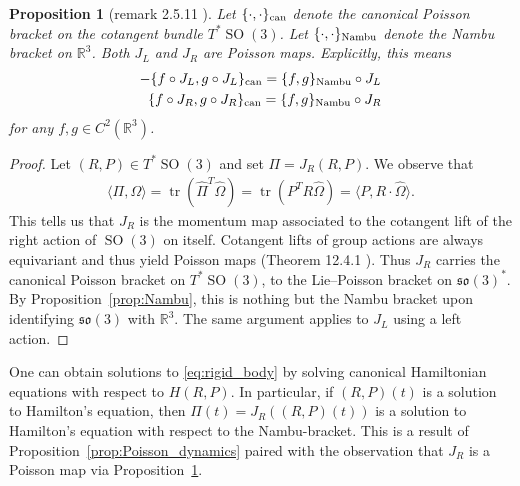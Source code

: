 \documentclass[12pt]{amsart}
\newcommand{\so}{\ensuremath{\mathfrak{so}}}
\newtheorem{prop}[thm]{Proposition}
\DeclareMathOperator{\SO}{SO}
\DeclareMathOperator{\tr}{tr}
\begin{document}
  \begin{prop}[remark 2.5.11 \cite{HolmBook2}] \label{prop:SO3_to_Nambu}
    Let $\{ \cdot , \cdot \}_{\rm can}$ denote the canonical Poisson bracket
    on the cotangent bundle $T^* \SO(3)$.
    Let $\{ \cdot , \cdot \}_{\rm Nambu}$ denote the Nambu bracket on $\mathbb{R}^3$.
    Both $J_L$ and $J_R$ are Poisson maps.
    Explicitly, this means
    \begin{align*}
      -\{ f \circ J_L , g \circ J_L \}_{\rm can} = \{ f , g \}_{\rm Nambu} \circ J_L \\
      \{ f \circ J_R , g \circ J_R \}_{\rm can} = \{ f , g \}_{\rm Nambu} \circ J_R \\
    \end{align*}
    for any $f,g \in C^2( \mathbb{R}^3)$.
  \end{prop}
  \begin{proof}
    Let $(R,P) \in T^* \SO(3)$ and set $\Pi = J_R(R,P)$.
    We observe that
    \begin{align*}
      \langle \Pi , \Omega \rangle
      = \tr( \hat{\Pi}^T \hat{\Omega} ) 
      = \tr( P^T R \hat{\Omega} ) 
      = \langle P , R \cdot \hat{\Omega} \rangle.
    \end{align*}
    This tells us that $J_R$ is the momentum map associated
    to the cotangent lift of the right action of $\SO(3)$ on itself.
    Cotangent lifts of group actions are always equivariant
    and thus yield Poisson maps (Theorem 12.4.1 \cite{MandS}).
    Thus $J_R$ carries the canonical
    Poisson bracket on $T^* \SO(3)$, to the Lie--Poisson
    bracket on $\so(3)^*$.
    By Proposition~\ref{prop:Nambu}, this is nothing but the
    Nambu bracket upon identifying $\so(3)$ with $\mathbb{R}^3$.
    The same argument applies to $J_L$ using a left action.
  \end{proof}

  One can obtain solutions to \eqref{eq:rigid_body}
  by solving canonical Hamiltonian equations with respect to $H(R,P)$.
  In particular, if $(R,P)(t)$ is a solution to Hamilton's equation,
  then $\Pi(t) = J_R( (R,P)(t))$ is a solution to Hamilton's equation
  with respect to the Nambu-bracket.
  This is a result of Proposition~\ref{prop:Poisson_dynamics}
  paired with the observation that $J_R$ is a Poisson map via
  Proposition~\ref{prop:SO3_to_Nambu}.
\end{document}
